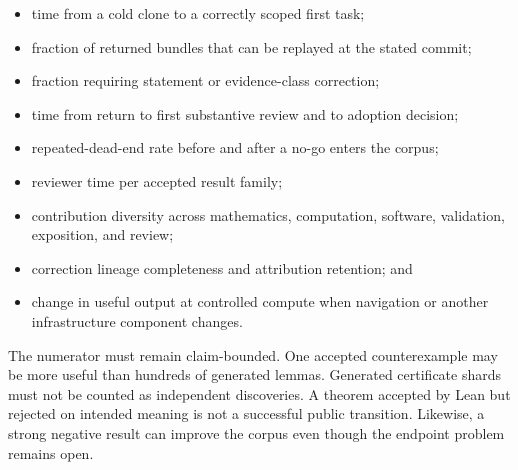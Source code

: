\documentclass[10pt]{article}
\begin{document}
\begin{itemize}
\item time from a cold clone to a correctly scoped first task;
\item fraction of returned bundles that can be replayed at the stated commit;
\item fraction requiring statement or evidence-class correction;
\item time from return to first substantive review and to adoption decision;
\item repeated-dead-end rate before and after a no-go enters the corpus;
\item reviewer time per accepted result family;
\item contribution diversity across mathematics, computation, software,
      validation, exposition, and review;
\item correction lineage completeness and attribution retention; and
\item change in useful output at controlled compute when navigation or another
      infrastructure component changes.
\end{itemize}

The numerator must remain claim-bounded.  One accepted counterexample may be
more useful than hundreds of generated lemmas.  Generated certificate shards
must not be counted as independent discoveries.  A theorem accepted by Lean
but rejected on intended meaning is not a successful public transition.
Likewise, a strong negative result can improve the corpus even though the
endpoint problem remains open.
\end{document}
